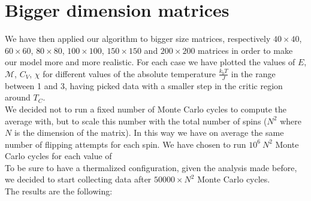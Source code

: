 \documentclass[10pt,a4paper,titlepage]{article}
\begin{document}
\section*{Bigger dimension matrices}
We have then applied our algorithm to bigger size matrices, respectively $40 \times 40$,$60 \times 60$, $80 \times 80$, $100 \times 100$, $150 \times 150$ and $200 \times 200$ matrices in order to make our model more and more realistic. For each case we have plotted the values of $E$, $\mathscr{M}$, $C_{V}$, $\chi$ for different values of the absolute temperature $\frac{k_{b}T}{J}$ in the range between 1 and 3, having picked data with a smaller step in the critic region around $T_{C}$. 
\\We decided not to run a fixed number of Monte Carlo cycles to compute the average with, but to scale this number with the total number of spins ($N^{2}$ where $N$ is the dimension of the matrix). In this way we have on average the same number of flipping attempts for each spin. We have chosen to run $10^{6}~N^{2}$ Monte Carlo cycles for each value of 
\\ To be sure to have a thermalized configuration, given the analysis made before, we decided to start collecting data after $50000\times N^2$ Monte Carlo cycles. 
\\The results are the following:
\end{document}
